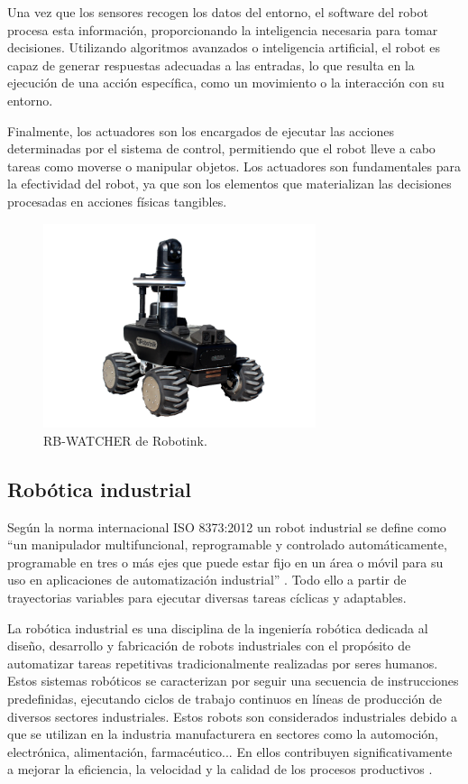 Una vez que los sensores recogen los datos del entorno, el software del robot procesa esta información, proporcionando la inteligencia necesaria para tomar decisiones. Utilizando algoritmos avanzados o inteligencia artificial, el robot es capaz de generar respuestas adecuadas a las entradas, lo que resulta en la ejecución de una acción específica, como un movimiento o la interacción con su entorno. 

Finalmente, los actuadores son los encargados de ejecutar las acciones determinadas por el sistema de control, permitiendo que el robot lleve a cabo tareas como moverse o manipular objetos. Los actuadores son fundamentales para la efectividad del robot, ya que son los elementos que materializan las decisiones procesadas en acciones físicas tangibles. 

\begin{figure} [h!]
  \begin{center}
    \includegraphics[width=8cm]{figs/Robot_intro}
  \end{center}
  \caption{\centering RB-WATCHER de Robotink.}
  \label{fig:Robot_intro}
\end{figure}

\subsection{Robótica industrial}

Según la norma internacional ISO 8373:2012 un robot industrial se define como ``un manipulador multifuncional, reprogramable y controlado automáticamente, programable en tres o más ejes que puede estar fijo en un área o móvil para su uso en aplicaciones de automatización industrial'' \cite{definicion_iso}. Todo ello a partir de trayectorias variables para ejecutar diversas tareas cíclicas y adaptables. 

La robótica industrial es una disciplina de la ingeniería robótica dedicada al diseño, desarrollo y fabricación de robots industriales con el propósito de automatizar tareas repetitivas tradicionalmente realizadas por seres humanos. Estos sistemas robóticos se caracterizan por seguir una secuencia de instrucciones predefinidas, ejecutando ciclos de trabajo continuos en líneas de producción de diversos sectores industriales. Estos robots son considerados industriales debido a que se utilizan en la industria manufacturera en sectores como la automoción, electrónica, alimentación, farmacéutico... En ellos contribuyen significativamente a mejorar la eficiencia, la velocidad y la calidad de los procesos productivos \cite{info_robotica_industrial_1}. 

